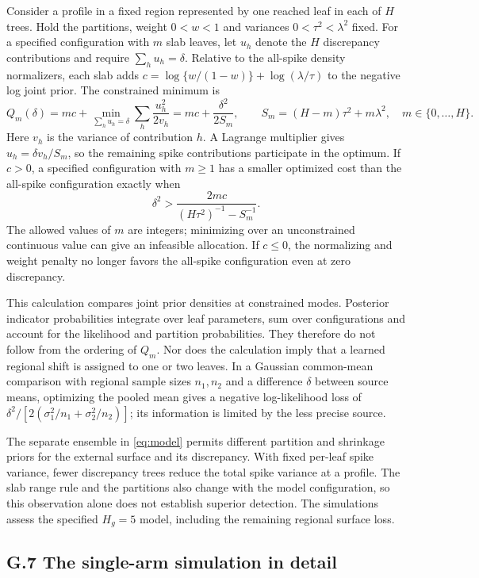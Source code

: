Consider a profile in a fixed region represented by one reached leaf in each of $H$ trees. Hold the partitions, weight $0<w<1$ and variances $0<\tau^2<\lambda^2$ fixed. For a specified configuration with $m$ slab leaves, let $u_h$ denote the $H$ discrepancy contributions and require $\sum_hu_h=\delta$. Relative to the all-spike density normalizers, each slab adds $c=\log\{w/(1-w)\}+\log(\lambda/\tau)$ to the negative log joint prior. The constrained minimum is
\[
Q_m(\delta)=mc+\min_{\sum_hu_h=\delta}\sum_h\frac{u_h^2}{2v_h}
=mc+\frac{\delta^2}{2S_m},\qquad
S_m=(H-m)\tau^2+m\lambda^2,\quad m\in\{0,\ldots,H\}.
\]
Here $v_h$ is the variance of contribution $h$. A Lagrange multiplier gives $u_h=\delta v_h/S_m$, so the remaining spike contributions participate in the optimum. If $c>0$, a specified configuration with $m\ge1$ has a smaller optimized cost than the all-spike configuration exactly when
\[
\delta^2>\frac{2mc}{(H\tau^2)^{-1}-S_m^{-1}}.
\]
The allowed values of $m$ are integers; minimizing over an unconstrained continuous value can give an infeasible allocation. If $c\le0$, the normalizing and weight penalty no longer favors the all-spike configuration even at zero discrepancy.

This calculation compares joint prior densities at constrained modes. Posterior indicator probabilities integrate over leaf parameters, sum over configurations and account for the likelihood and partition probabilities. They therefore do not follow from the ordering of $Q_m$. Nor does the calculation imply that a learned regional shift is assigned to one or two leaves. In a Gaussian common-mean comparison with regional sample sizes $n_1,n_2$ and a difference $\delta$ between source means, optimizing the pooled mean gives a negative log-likelihood loss of $\delta^2/[2(\sigma_1^2/n_1+\sigma_2^2/n_2)]$; its information is limited by the less precise source.

The separate ensemble in \eqref{eq:model} permits different partition and shrinkage priors for the external surface and its discrepancy. With fixed per-leaf spike variance, fewer discrepancy trees reduce the total spike variance at a profile. The slab range rule and the partitions also change with the model configuration, so this observation alone does not establish superior detection. The simulations assess the specified $H_g=5$ model, including the remaining regional surface loss.

\subsection*{G.7 The single-arm simulation in detail}


